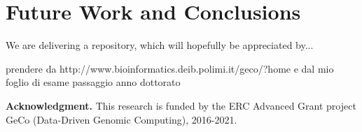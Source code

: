 \documentclass[journal]{IEEEtran}
\begin{document}
\section{Future Work and Conclusions}
We are delivering a repository, which will hopefully be appreciated by...


\cite{bernasconi2017conceptual}


prendere da http://www.bioinformatics.deib.polimi.it/geco/?home
e dal mio foglio di esame passaggio anno dottorato

{\bf Acknowledgment.} This research is funded by the ERC Advanced Grant project GeCo (Data-Driven Genomic Computing), 2016-2021.


 
\end{document}
